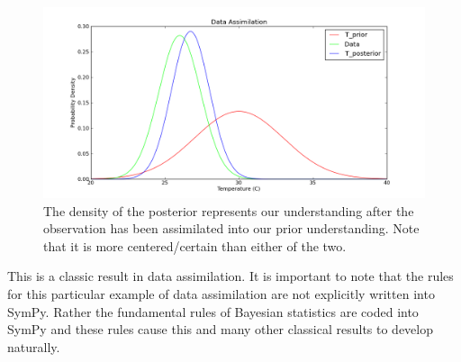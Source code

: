 \begin{figure}[ht]
\vspace{-0pt}
\centering
\includegraphics[width=.7\textwidth]{images/posterior.png}
\vspace{-0pt}
\caption{The density of the posterior represents our understanding after the observation has been assimilated into our prior understanding. Note that it is more centered/certain than either of the two. }
\label{fig:DA_posterior}
\vspace{00pt}
\end{figure}

This is a classic result in data assimilation. It is important to note that
the rules for this particular example of data assimilation are not explicitly written into SymPy. Rather the fundamental rules of Bayesian statistics are coded into SymPy and these rules cause this and many other classical results to develop naturally.
